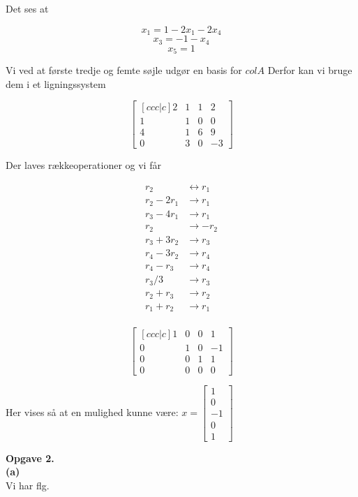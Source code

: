 \documentclass[12pt]{article}
\begin{document}
{Det ses at 

\[x_1 = 1 - 2x_1 - 2x_4\]
\[x_3 = -1 - x_4\]
\[x_5 = 1\]


Vi ved at første tredje og femte søjle udgør en basis for $col A$
Derfor kan vi bruge dem i et ligningssystem

\[
\begin{bmatrix}[ccc|c]
2 & 1 & 1 & 2\\
1 & 1 & 0 & 0\\
4 & 1 & 6 & 9\\
0 & 3 & 0 & -3
\end{bmatrix}
\]

Der laves rækkeoperationer og vi får

\begin{align*}
r_2 &\leftrightarrow r_1\\
r_2 - 2r_1&\rightarrow r_1\\
r_3 - 4r_1 &\rightarrow r_1\\
r_2 &\rightarrow -r_2\\
r_3 + 3r_2 &\rightarrow r_3\\
r_4 - 3r_2 &\rightarrow r_4\\
r_4 - r_3 &\rightarrow r_4\\
r_3 / 3 &\rightarrow r_3\\
r_2 + r_3 &\rightarrow r_2\\
r_1 + r_2 &\rightarrow r_1\\
\end{align*}

\[
\begin{bmatrix}[ccc|c]
1 & 0 & 0 & 1\\
0 & 1 & 0 & -1\\
0 & 0 & 1 & 1\\
0 & 0 & 0 & 0
\end{bmatrix}
\]

Her vises så at en mulighed kunne være: $x  = \begin{bmatrix}1\\0\\-1\\0\\1\end{bmatrix}$

\textbf{\large Opgave 2.}\\

\textbf{(a)}\\

Vi har flg. 

}
\end{document}
